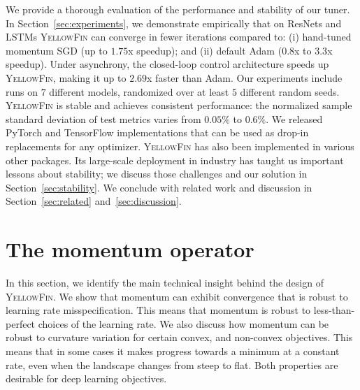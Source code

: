 \documentclass{article} %
\newcommand{\tuner}{\textsc{YellowFin}\xspace}
\newcommand{\yell}[1]{#1}
\begin{document}
We provide a thorough evaluation of the performance and stability of our tuner.
In Section~\ref{sec:experiments}, we demonstrate empirically that \yell{on ResNets and LSTMs}
\tuner can converge in fewer iterations compared to:
(i) hand-tuned momentum SGD (up to $1.75$x speedup);
and (ii) default Adam ($0.8$x to $3.3$x speedup).
Under asynchrony, the closed-loop control architecture speeds up \tuner, 
making it up to $2.69$x faster than Adam. 
Our experiments include runs on $7$ different models, randomized over at least $5$ different random seeds. 
\tuner is stable and achieves consistent performance: the normalized sample standard deviation of test metrics varies from $0.05\%$ to $0.6\%$.
We released PyTorch and TensorFlow implementations that can be used as drop-in replacements for any optimizer.
\tuner has also been implemented in various other packages.
Its large-scale deployment in industry has taught us important lessons about stability; we discuss those challenges and our solution in Section~\ref{sec:stability}.
We conclude with related work and discussion in Section~\ref{sec:related} and~\ref{sec:discussion}.



\section{The momentum operator}
\label{sec:momentum_operator}

\newcommand{\gc}{generalized curvature\xspace}
\newcommand{\Gc}{Generalized curvature\xspace}
\vspace{-0.25em}
In this section, we identify the main technical insight behind the design of \tuner. 
We show that momentum can exhibit convergence that is robust to learning rate misspecification.
This means that momentum is robust to less-than-perfect choices of the learning rate.
We also discuss how momentum can be robust to 
curvature variation for certain convex, and non-convex objectives.
This means that in some cases it makes progress towards a minimum at a constant rate, even when the landscape changes from steep to flat. 
Both properties are desirable for deep learning objectives.
\end{document}
